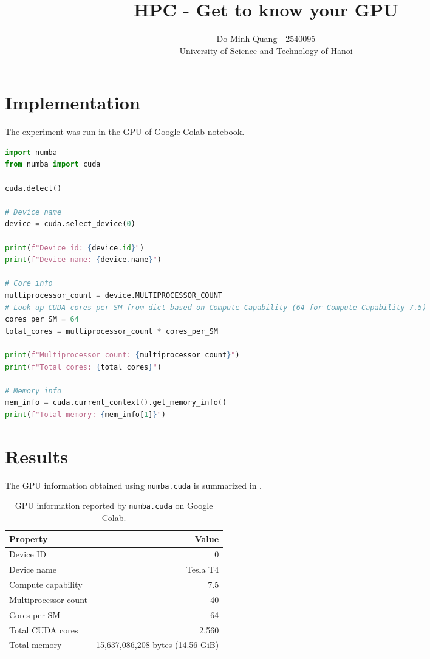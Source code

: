 \documentclass[11pt]{article}
\title{\textbf{HPC - Get to know your GPU}}
\author{
Do Minh Quang - 2540095\\
University of Science and Technology of Hanoi
}
\date{}
\begin{document}
\maketitle

\section{Implementation}
The experiment was run in the GPU of Google Colab notebook. 

\begin{lstlisting}[language=Python, label={lst:code}]
import numba
from numba import cuda

cuda.detect()

# Device name
device = cuda.select_device(0)

print(f"Device id: {device.id}")
print(f"Device name: {device.name}")

# Core info
multiprocessor_count = device.MULTIPROCESSOR_COUNT
# Look up CUDA cores per SM from dict based on Compute Capability (64 for Compute Capability 7.5)
cores_per_SM = 64 
total_cores = multiprocessor_count * cores_per_SM

print(f"Multiprocessor count: {multiprocessor_count}")
print(f"Total cores: {total_cores}")

# Memory info
mem_info = cuda.current_context().get_memory_info()
print(f"Total memory: {mem_info[1]}")
\end{lstlisting}

\section{Results}

The GPU information obtained using \texttt{numba.cuda} is
summarized in .

\begin{table}[H]
\centering
\caption{GPU information reported by \texttt{numba.cuda} on Google Colab.}
\label{tab:gpu}
\begin{tabular}{lr}
\toprule
\textbf{Property} & \textbf{Value} \\
\midrule
Device ID & 0 \\
Device name & Tesla T4 \\
Compute capability & 7.5 \\
Multiprocessor count & 40 \\
Cores per SM & 64 \\
Total CUDA cores & 2,560 \\
Total memory & 15,637,086,208 bytes (14.56 GiB) \\
\bottomrule
\end{tabular}
\end{table}
\end{document}
